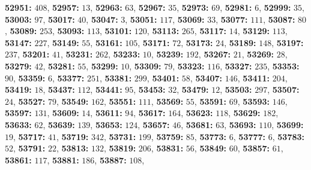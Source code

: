 \textsf{\bfseries 52951:} $408$, \textsf{\bfseries 52957:} $13$, \textsf{\bfseries 52963:} $63$, \textsf{\bfseries 52967:} $35$, \textsf{\bfseries 52973:} $69$, \textsf{\bfseries 52981:} $6$, \textsf{\bfseries 52999:} $35$, \textsf{\bfseries 53003:} $97$, \textsf{\bfseries 53017:} $40$, \textsf{\bfseries 53047:} $3$, \textsf{\bfseries 53051:} $117$, \textsf{\bfseries 53069:} $33$, \textsf{\bfseries 53077:} $111$, \textsf{\bfseries 53087:} $80$, \textsf{\bfseries 53089:} $253$, \textsf{\bfseries 53093:} $113$, \textsf{\bfseries 53101:} $120$, \textsf{\bfseries 53113:} $265$, \textsf{\bfseries 53117:} $14$, \textsf{\bfseries 53129:} $113$, \textsf{\bfseries 53147:} $227$, \textsf{\bfseries 53149:} $55$, \textsf{\bfseries 53161:} $105$, \textsf{\bfseries 53171:} $72$, \textsf{\bfseries 53173:} $24$, \textsf{\bfseries 53189:} $148$, \textsf{\bfseries 53197:} $237$, \textsf{\bfseries 53201:} $41$, \textsf{\bfseries 53231:} $262$, \textsf{\bfseries 53233:} $10$, \textsf{\bfseries 53239:} $192$, \textsf{\bfseries 53267:} $21$, \textsf{\bfseries 53269:} $28$, \textsf{\bfseries 53279:} $42$, \textsf{\bfseries 53281:} $55$, \textsf{\bfseries 53299:} $10$, \textsf{\bfseries 53309:} $79$, \textsf{\bfseries 53323:} $116$, \textsf{\bfseries 53327:} $235$, \textsf{\bfseries 53353:} $90$, \textsf{\bfseries 53359:} $6$, \textsf{\bfseries 53377:} $251$, \textsf{\bfseries 53381:} $299$, \textsf{\bfseries 53401:} $58$, \textsf{\bfseries 53407:} $146$, \textsf{\bfseries 53411:} $204$, \textsf{\bfseries 53419:} $18$, \textsf{\bfseries 53437:} $112$, \textsf{\bfseries 53441:} $95$, \textsf{\bfseries 53453:} $32$, \textsf{\bfseries 53479:} $12$, \textsf{\bfseries 53503:} $297$, \textsf{\bfseries 53507:} $24$, \textsf{\bfseries 53527:} $79$, \textsf{\bfseries 53549:} $162$, \textsf{\bfseries 53551:} $111$, \textsf{\bfseries 53569:} $55$, \textsf{\bfseries 53591:} $69$, \textsf{\bfseries 53593:} $146$, \textsf{\bfseries 53597:} $131$, \textsf{\bfseries 53609:} $14$, \textsf{\bfseries 53611:} $94$, \textsf{\bfseries 53617:} $164$, \textsf{\bfseries 53623:} $118$, \textsf{\bfseries 53629:} $182$, \textsf{\bfseries 53633:} $62$, \textsf{\bfseries 53639:} $139$, \textsf{\bfseries 53653:} $124$, \textsf{\bfseries 53657:} $46$, \textsf{\bfseries 53681:} $63$, \textsf{\bfseries 53693:} $110$, \textsf{\bfseries 53699:} $19$, \textsf{\bfseries 53717:} $41$, \textsf{\bfseries 53719:} $342$, \textsf{\bfseries 53731:} $199$, \textsf{\bfseries 53759:} $85$, \textsf{\bfseries 53773:} $6$, \textsf{\bfseries 53777:} $6$, \textsf{\bfseries 53783:} $52$, \textsf{\bfseries 53791:} $22$, \textsf{\bfseries 53813:} $132$, \textsf{\bfseries 53819:} $206$, \textsf{\bfseries 53831:} $56$, \textsf{\bfseries 53849:} $60$, \textsf{\bfseries 53857:} $61$, \textsf{\bfseries 53861:} $117$, \textsf{\bfseries 53881:} $186$, \textsf{\bfseries 53887:} $108$, 